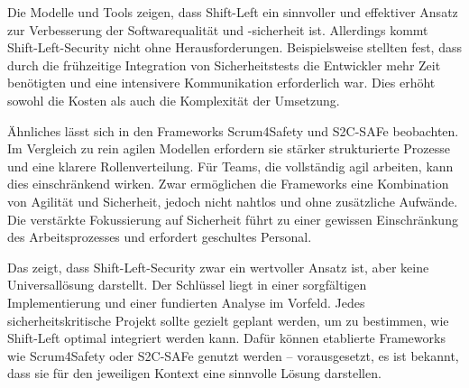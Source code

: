 Die Modelle und Tools zeigen, dass Shift-Left ein sinnvoller und effektiver Ansatz zur Verbesserung der Softwarequalität und -sicherheit ist. Allerdings kommt Shift-Left-Security nicht ohne Herausforderungen. Beispielsweise stellten \citet{andriadi_impact_2023} fest, dass durch die frühzeitige Integration von Sicherheitstests die Entwickler mehr Zeit benötigten und eine intensivere Kommunikation erforderlich war. Dies erhöht sowohl die Kosten als auch die Komplexität der Umsetzung.

Ähnliches lässt sich in den Frameworks Scrum4Safety und S2C-SAFe beobachten. Im Vergleich zu rein agilen Modellen erfordern sie stärker strukturierte Prozesse und eine klarere Rollenverteilung. Für Teams, die vollständig agil arbeiten, kann dies einschränkend wirken. Zwar ermöglichen die Frameworks eine Kombination von Agilität und Sicherheit, jedoch nicht nahtlos und ohne zusätzliche Aufwände. Die verstärkte Fokussierung auf Sicherheit führt zu einer gewissen Einschränkung des Arbeitsprozesses und erfordert geschultes Personal.

Das zeigt, dass Shift-Left-Security zwar ein wertvoller Ansatz ist, aber keine Universallösung darstellt. Der Schlüssel liegt in einer sorgfältigen Implementierung und einer fundierten Analyse im Vorfeld. Jedes sicherheitskritische Projekt sollte gezielt geplant werden, um zu bestimmen, wie Shift-Left optimal integriert werden kann. Dafür können etablierte Frameworks wie Scrum4Safety oder S2C-SAFe genutzt werden – vorausgesetzt, es ist bekannt, dass sie für den jeweiligen Kontext eine sinnvolle Lösung darstellen.